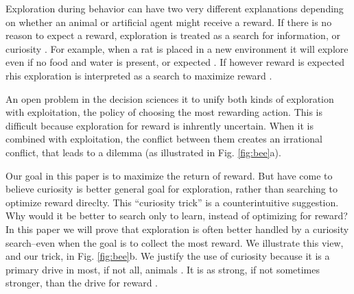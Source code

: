 Exploration during behavior can have two very different explanations depending on whether an animal or artificial agent might receive a reward. If there is no reason to expect a reward, exploration is treated as a search for information, or curiosity \cite{Berlyne1950,Schmidhuber1991,Kidd2015,Jaegle2019,Friston2016,Sumner2019,Calhoun2014,Wang2019,Auersperg2015}. For example, when a rat is placed in a new environment it will explore even if no food and water is present, or expected \cite{TODO}. If however reward is expected rhis exploration is interpreted as a search to maximize reward \cite{Gupta2006,Sutton2018,Woodgate2017,Lee2011a,Schulz2018a}. %

An open problem in the decision sciences it to unify both kinds of exploration with exploitation, the policy of choosing the most rewarding action. This is difficult because exploration for reward is inhrently uncertain. When it is combined with exploitation, the conflict between them creates an irrational conflict, that leads to a dilemma \citep{Kelly1956,Berger-Tal2014,Dayan1996,Thrun1992,Mehlhorn2015,Kobayashi2019} (as illustrated in Fig. \ref{fig:bee}a).

Our goal in this paper is to maximize the return of reward. But have come to believe curiosity is better general goal for exploration, rather than searching to optimize reward direclty. This ``curiosity trick'' is a counterintuitive suggestion. Why would it be better to search only to learn, instead of optimizing for reward? In this paper we will prove that exploration is often better handled by a curiosity search--even when the goal is to collect the most reward. We illustrate this view, and our trick, in Fig. \ref{fig:bee}b. We justify the use of curiosity because it is a primary drive in most, if not all, animals \cite{Loewenstein1994,Inglis2001}. It is as strong, if not sometimes stronger, than the drive for reward \cite{Loewenstein1994,Kidd2015,Gottlieb2018}.

